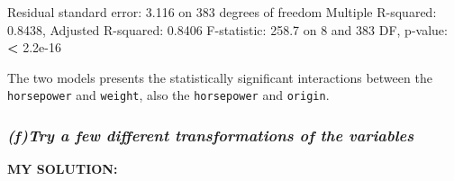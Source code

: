 \documentclass[
]{article}
\newenvironment{Shaded}{\begin{snugshade}}{\end{snugshade}}
\newcommand{\DecValTok}[1]{\textcolor[rgb]{0.00,0.00,0.81}{#1}}
\newcommand{\ErrorTok}[1]{\textcolor[rgb]{0.64,0.00,0.00}{\textbf{#1}}}
\newcommand{\FloatTok}[1]{\textcolor[rgb]{0.00,0.00,0.81}{#1}}
\newcommand{\NormalTok}[1]{#1}
\newcommand{\SpecialCharTok}[1]{\textcolor[rgb]{0.00,0.00,0.00}{#1}}
\begin{document}
\begin{Shaded}
\begin{Highlighting}[]
\NormalTok{Residual standard error}\SpecialCharTok{:} \FloatTok{3.116}\NormalTok{ on }\DecValTok{383}\NormalTok{ degrees of freedom}
\NormalTok{Multiple R}\SpecialCharTok{{-}}\NormalTok{squared}\SpecialCharTok{:}  \FloatTok{0.8438}\NormalTok{,    Adjusted R}\SpecialCharTok{{-}}\NormalTok{squared}\SpecialCharTok{:}  \FloatTok{0.8406} 
\NormalTok{F}\SpecialCharTok{{-}}\NormalTok{statistic}\SpecialCharTok{:} \FloatTok{258.7}\NormalTok{ on }\DecValTok{8}\NormalTok{ and }\DecValTok{383}\NormalTok{ DF,  p}\SpecialCharTok{{-}}\NormalTok{value}\SpecialCharTok{:} \ErrorTok{\textless{}} \FloatTok{2.2e{-}16}
\end{Highlighting}
\end{Shaded}

The two models presents the statistically significant interactions
between the \texttt{horsepower} and \texttt{weight}, also the
\texttt{horsepower} and \texttt{origin}.

\hypertarget{ftry-a-few-different-transformations-of-the-variables}{%
\subsubsection{\texorpdfstring{\emph{(f)Try a few different
transformations of the
variables}}{(f)Try a few different transformations of the variables}}\label{ftry-a-few-different-transformations-of-the-variables}}

\textbf{MY SOLUTION:}
\end{document}
